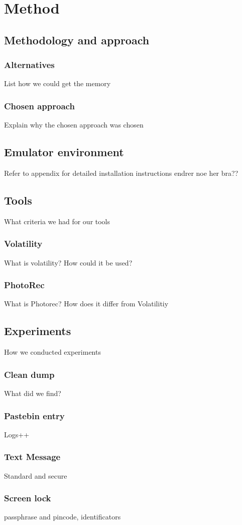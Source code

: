 \section{Method}
\subsection{Methodology and approach}
\subsubsection{Alternatives}
List how we could get the memory
\subsubsection{Chosen approach}
Explain why the chosen approach was chosen
\subsection{Emulator environment}
Refer to appendix for detailed installation instructions
endrer noe her bra??
\subsection{Tools}
What criteria we had for our tools
\subsubsection{Volatility}
What is volatility? How could it be used?
\subsubsection{PhotoRec}
What is Photorec? How does it differ from Volatilitiy
\subsection{Experiments}
How we conducted experiments
\subsubsection{Clean dump}
What did we find?
\subsubsection{Pastebin entry}
Logs++
\subsubsection{Text Message}
Standard and secure
\subsubsection{Screen lock}
passphrase and pincode, identificators




